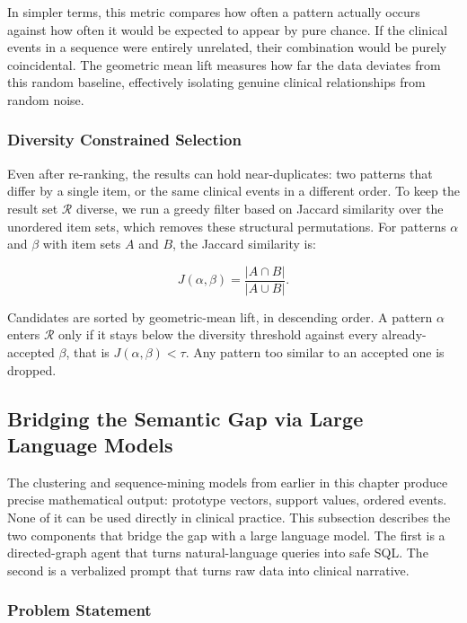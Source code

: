 In simpler terms, this metric compares how often a pattern actually occurs against how often it would be expected to appear by pure chance. If the clinical events in a sequence were entirely unrelated, their combination would be purely coincidental. The geometric mean lift measures how far the data deviates from this random baseline, effectively isolating genuine clinical relationships from random noise.

\subsubsection*{Diversity Constrained Selection}

Even after re-ranking, the results can hold near-duplicates: two patterns that differ by a single item, or the same clinical events in a different order. To keep the result set $\mathcal{R}$ diverse, we run a greedy filter based on Jaccard similarity over the unordered item sets, which removes these structural permutations. For patterns $\alpha$ and $\beta$ with item sets $A$ and $B$, the Jaccard similarity is:

\begin{equation}
    J(\alpha, \beta) = \frac{|A \cap B|}{|A \cup B|}.
    \label{eq:jaccard}
\end{equation}

Candidates are sorted by geometric-mean lift, in descending order. A pattern $\alpha$ enters $\mathcal{R}$ only if it stays below the diversity threshold against every already-accepted $\beta$, that is $J(\alpha, \beta) < \tau$. Any pattern too similar to an accepted one is dropped.

\subsection{Bridging the Semantic Gap via Large Language Models}

The clustering and sequence-mining models from earlier in this chapter produce precise mathematical output: prototype vectors, support values, ordered events. None of it can be used directly in clinical practice. This subsection describes the two components that bridge the gap with a large language model. The first is a directed-graph agent that turns natural-language queries into safe SQL. The second is a verbalized prompt that turns raw data into clinical narrative.

\subsubsection*{Problem Statement}

